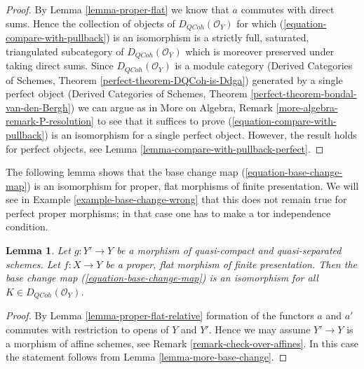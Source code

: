 \documentclass{stacks-project}
\theoremstyle{plain}
\newtheorem{lemma}[subsection]{Lemma}
\theoremstyle{definition}
\theoremstyle{remark}
\numberwithin{equation}{subsection}
\def\QCoh{\mathit{QCoh}}
\begin{document}
\begin{proof}
By Lemma \ref{lemma-proper-flat} we know that $a$ commutes
with direct sums. Hence the collection of objects of
$D_\QCoh(\mathcal{O}_Y)$ for which (\ref{equation-compare-with-pullback})
is an isomorphism is a strictly full, saturated, triangulated
subcategory of $D_\QCoh(\mathcal{O}_Y)$ which is moreover
preserved under taking direct sums. Since $D_\QCoh(\mathcal{O}_Y)$
is a module category (Derived Categories of Schemes, Theorem
\ref{perfect-theorem-DQCoh-is-Ddga}) generated by a single
perfect object (Derived Categories of Schemes, Theorem
\ref{perfect-theorem-bondal-van-den-Bergh})
we can argue as in
More on Algebra, Remark \ref{more-algebra-remark-P-resolution}
to see that it suffices to prove (\ref{equation-compare-with-pullback})
is an isomorphism for a single perfect object.
However, the result holds for perfect objects, see
Lemma \ref{lemma-compare-with-pullback-perfect}.
\end{proof}

\noindent
The following lemma shows that the base change map
(\ref{equation-base-change-map}) is an isomorphism
for proper, flat morphisms of finite presentation.
We will see in
Example \ref{example-base-change-wrong}
that this does not remain true for perfect proper morphisms;
in that case one has to make a tor independence condition.

\begin{lemma}
\label{lemma-proper-flat-base-change}
Let $g : Y' \to Y$ be a morphism of quasi-compact and quasi-separated schemes.
Let $f : X \to Y$ be a proper, flat morphism of finite presentation.
Then the base change map (\ref{equation-base-change-map}) is an isomorphism
for all $K \in D_\QCoh(\mathcal{O}_Y)$.
\end{lemma}

\begin{proof}
By Lemma \ref{lemma-proper-flat-relative} formation of the
functors $a$ and $a'$ commutes with restriction to opens of $Y$ and $Y'$.
Hence we may assume $Y' \to Y$ is a morphism of affine schemes, see
Remark \ref{remark-check-over-affines}. In this
case the statement follows from Lemma \ref{lemma-more-base-change}.
\end{proof}
\end{document}
